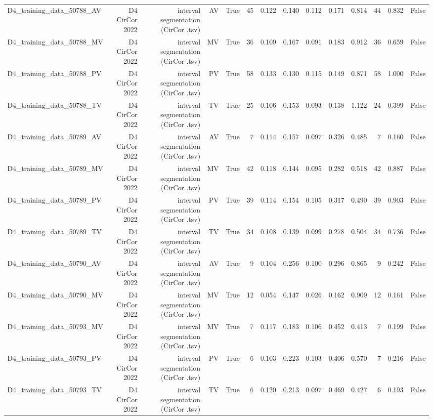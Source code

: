 \begin{table}[htbp]
\begin{tabular}{lrrrrrrrrrrrrr}
    D4\_training\_data\_50788\_AV & D4 CirCor 2022 & interval segmentation (CirCor .tsv) & AV & True & 45 & 0.122 & 0.140 & 0.112 & 0.171 & 0.814 & 44 & 0.832 & False \\
    D4\_training\_data\_50788\_MV & D4 CirCor 2022 & interval segmentation (CirCor .tsv) & MV & True & 36 & 0.109 & 0.167 & 0.091 & 0.183 & 0.912 & 36 & 0.659 & False \\
    D4\_training\_data\_50788\_PV & D4 CirCor 2022 & interval segmentation (CirCor .tsv) & PV & True & 58 & 0.133 & 0.130 & 0.115 & 0.149 & 0.871 & 58 & 1.000 & False \\
    D4\_training\_data\_50788\_TV & D4 CirCor 2022 & interval segmentation (CirCor .tsv) & TV & True & 25 & 0.106 & 0.153 & 0.093 & 0.138 & 1.122 & 24 & 0.399 & False \\
    D4\_training\_data\_50789\_AV & D4 CirCor 2022 & interval segmentation (CirCor .tsv) & AV & True & 7 & 0.114 & 0.157 & 0.097 & 0.326 & 0.485 & 7 & 0.160 & False \\
    D4\_training\_data\_50789\_MV & D4 CirCor 2022 & interval segmentation (CirCor .tsv) & MV & True & 42 & 0.118 & 0.144 & 0.095 & 0.282 & 0.518 & 42 & 0.887 & False \\
    D4\_training\_data\_50789\_PV & D4 CirCor 2022 & interval segmentation (CirCor .tsv) & PV & True & 39 & 0.114 & 0.154 & 0.105 & 0.317 & 0.490 & 39 & 0.903 & False \\
    D4\_training\_data\_50789\_TV & D4 CirCor 2022 & interval segmentation (CirCor .tsv) & TV & True & 34 & 0.108 & 0.139 & 0.099 & 0.278 & 0.504 & 34 & 0.736 & False \\
    D4\_training\_data\_50790\_AV & D4 CirCor 2022 & interval segmentation (CirCor .tsv) & AV & True & 9 & 0.104 & 0.256 & 0.100 & 0.296 & 0.865 & 9 & 0.242 & False \\
    D4\_training\_data\_50790\_MV & D4 CirCor 2022 & interval segmentation (CirCor .tsv) & MV & True & 12 & 0.054 & 0.147 & 0.026 & 0.162 & 0.909 & 12 & 0.161 & False \\
    D4\_training\_data\_50793\_MV & D4 CirCor 2022 & interval segmentation (CirCor .tsv) & MV & True & 7 & 0.117 & 0.183 & 0.106 & 0.452 & 0.413 & 7 & 0.199 & False \\
    D4\_training\_data\_50793\_PV & D4 CirCor 2022 & interval segmentation (CirCor .tsv) & PV & True & 6 & 0.103 & 0.223 & 0.103 & 0.406 & 0.570 & 7 & 0.216 & False \\
    D4\_training\_data\_50793\_TV & D4 CirCor 2022 & interval segmentation (CirCor .tsv) & TV & True & 6 & 0.120 & 0.213 & 0.097 & 0.469 & 0.427 & 6 & 0.193 & False \\

\end{tabular}
\end{table}
